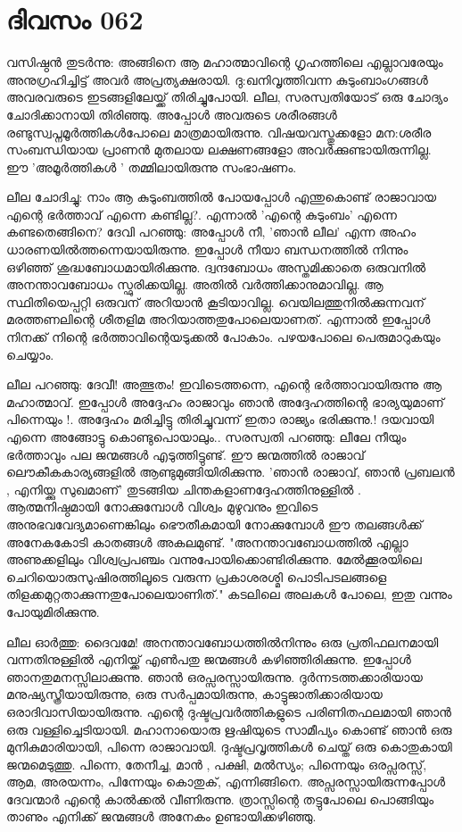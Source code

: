  
\section{ദിവസം 062}


വസിഷ്ഠന്‍ തുടര്‍ന്നു: അങ്ങിനെ ആ മഹാത്മാവിന്റെ ഗൃഹത്തിലെ എല്ലാവരേയും അനുഗ്രഹിച്ചിട്ട്‌ അവര്‍ അപ്രത്യക്ഷരായി. ദു:ഖനിവൃത്തിവന്ന കുടുംബാംഗങ്ങള്‍ അവരവരുടെ ഇടങ്ങളിലേയ്ക്ക്‌ തിരിച്ചുപോയി. ലീല, സരസ്വതിയോട്‌ ഒരു ചോദ്യം ചോദിക്കാനായി തിരിഞ്ഞു. അപ്പോള്‍ അവരുടെ ശരീരങ്ങള്‍ രണ്ടുസ്വപ്നമൂര്‍ത്തികള്‍പോലെ മാത്രമായിരുന്നു. വിഷയവസ്തുക്കളോ മന:ശരീര സംബന്ധിയായ പ്രാണന്‍ മുതലായ ലക്ഷണങ്ങളോ അവര്‍ക്കുണ്ടായിരുന്നില്ല. ഈ 'അമൂര്‍ത്തികള്‍ ' തമ്മിലായിരുന്നു സംഭാഷണം. 

ലീല ചോദിച്ചു: നാം ആ കുടുംബത്തില്‍ പോയപ്പോള്‍ എന്തുകൊണ്ട്‌ രാജാവായ എന്റെ ഭര്‍ത്താവ്‌ എന്നെ കണ്ടില്ല?. എന്നാല്‍ 'എന്റെ കുടുംബം' എന്നെ കണ്ടതെങ്ങിനെ? ദേവി പറഞ്ഞു: അപ്പോള്‍ നീ, 'ഞാന്‍ ലീല' എന്ന അഹം ധാരണയില്‍ത്തന്നെയായിരുന്നു. ഇപ്പോള്‍ നീയാ ബന്ധനത്തില്‍ നിന്നും ഒഴിഞ്ഞ്‌ ശുദ്ധബോധമായിരിക്കുന്നു. ദ്വന്ദബോധം അസ്തമിക്കാതെ ഒരുവനില്‍ അനന്താവബോധം സ്ഫുരിക്കയില്ല. അതില്‍ വര്‍ത്തിക്കാനുമാവില്ല. ആ സ്ഥിതിയെപ്പറ്റി ഒരുവന്‌ അറിയാന്‍ കൂടിയാവില്ല. വെയിലത്തുനില്‍ക്കുന്നവന്‌ മരത്തണലിന്റെ ശീതളിമ അറിയാത്തതുപോലെയാണത്‌. എന്നാല്‍ ഇപ്പോള്‍ നിനക്ക്‌ നിന്റെ ഭര്‍ത്താവിന്റെയടുക്കല്‍ പോകാം. പഴയപോലെ പെരുമാറുകയും ചെയ്യാം.

ലീല പറഞ്ഞു: ദേവീ! അത്ഭുതം! ഇവിടെത്തന്നെ, എന്റെ ഭര്‍ത്താവായിരുന്നു ആ മഹാത്മാവ്‌. ഇപ്പോള്‍ അദ്ദേഹം രാജാവും ഞാന്‍ അദ്ദേഹത്തിന്റെ ഭാര്യയുമാണ്‌ പിന്നെയും !. അദ്ദേഹം മരിച്ചിട്ടു തിരിച്ചുവന്ന് ഇതാ രാജ്യം ഭരിക്കുന്നു.! ദയവായി എന്നെ അങ്ങോട്ടു കൊണ്ടുപൊയാലും.. സരസ്വതി പറഞ്ഞു: ലീലേ നീയും ഭര്‍ത്താവും പല ജന്മങ്ങള്‍ എടുത്തിട്ടുണ്ട്‌. ഈ ജന്മത്തില്‍ രാജാവ്‌ ലൌകീകകാര്യങ്ങളില്‍ ആണ്ടുമുങ്ങിയിരിക്കുന്നു. 'ഞാന്‍ രാജാവ്‌, ഞാന്‍ പ്രബലന്‍ , എനിയ്ക്കു സുഖമാണ്‌' തുടങ്ങിയ ചിന്തകളാണദ്ദേഹത്തിനുള്ളില്‍ . ആത്മനിഷ്ഠമായി നോക്കുമ്പോള്‍ വിശ്വം മുഴുവനും ഇവിടെ അനുഭവവേദ്യമാണെങ്കിലും ഭൌതീകമായി  നോക്കുമ്പോള്‍ ഈ തലങ്ങള്‍ക്ക്‌ അനേകകോടി കാതങ്ങള്‍ അകലമുണ്ട്‌. "അനന്താവബോധത്തില്‍ എല്ലാ അണുക്കളിലും വിശ്വപ്രപഞ്ചം വന്നുപോയിക്കൊണ്ടിരിക്കുന്നു. മേല്‍ക്കൂരയിലെ ചെറിയൊരുസുഷിരത്തിലൂടെ വരുന്ന പ്രകാശരശ്മി പൊടിപടലങ്ങളെ തിളക്കമുറ്റതാക്കുന്നതുപോലെയാണിത്‌." കടലിലെ അലകള്‍ പോലെ, ഇതു വന്നും പോയുമിരിക്കുന്നു.

ലീല ഓര്‍ത്തു: ദൈവമേ! അനന്താവബോധത്തില്‍നിന്നും ഒരു പ്രതിഫലനമായി വന്നതിനുള്ളില്‍ എനിയ്ക്ക്‌ എണ്‍പതു ജന്മങ്ങള്‍ കഴിഞ്ഞിരിക്കുന്നു. ഇപ്പോൾ ഞാനതുമനസ്സിലാക്കുന്നു. ഞാന്‍ ഒരപ്സരസ്സായിരുന്നു. ദുര്‍ന്നടത്തക്കാരിയായ മനുഷ്യസ്ത്രീയായിരുന്നു, ഒരു സര്‍പ്പമായിരുന്നു, കാട്ടുജാതിക്കാരിയായ ഒരാദിവാസിയായിരുന്നു. എന്റെ ദുഷ്ടപ്രവര്‍ത്തികളുടെ പരിണിതഫലമായി ഞാന്‍ ഒരു വള്ളിച്ചെടിയായി. മഹാനായൊരു ഋഷിയുടെ സാമീപ്യം കൊണ്ട്‌ ഞാന്‍ ഒരു മുനികുമാരിയായി, പിന്നെ രാജാവായി. ദുഷ്ടപ്രവൃത്തികള്‍ ചെയ്ത്‌ ഒരു കൊതുകായി ജന്മമെടുത്തു. പിന്നെ, തേനീച്ച, മാന്‍ , പക്ഷി, മല്‍സ്യം; പിന്നെയും ഒരപ്സരസ്സ്‌, ആമ, അരയന്നം, പിന്നേയും കൊതുക്‌, എന്നിങ്ങിനെ. അപ്സരസ്സായിരുന്നപ്പോള്‍ ദേവന്മാര്‍ എന്റെ കാല്‍ക്കല്‍ വീണിരുന്നു. ത്രാസ്സിന്റെ തട്ടുപോലെ പൊങ്ങിയും താണും എനിക്ക് ജന്മങ്ങള്‍ അനേകം ഉണ്ടായിക്കഴിഞ്ഞു.

